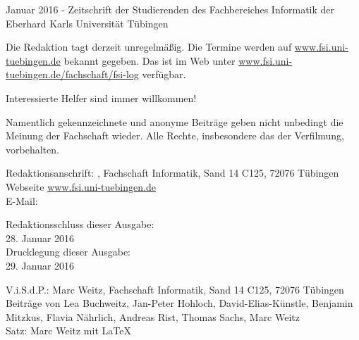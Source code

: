 \nameit \space \space Januar 2016 - Zeitschrift der Studierenden des Fachbereiches Informatik der Eberhard Karls Universität Tübingen

Die Redaktion tagt derzeit unregelmäßig. Die Termine werden auf \url{www.fsi.uni-tuebingen.de} bekannt  gegeben.  Das  \nameit \space ist  im  Web  unter \url{www.fsi.uni-tuebingen.de/fachschaft/fsi-log} verfügbar.

Interessierte Helfer sind immer willkommen!

Namentlich gekennzeichnete und anonyme Beiträge geben nicht unbedingt die Meinung der Fachschaft wieder. Alle Rechte, insbesondere das der Verfilmung, vorbehalten.

Redaktionsanschrift:
\nameit, Fachschaft Informatik, Sand 14 C125, 72076 Tübingen\\
Webseite \url{www.fsi.uni-tuebingen.de}\\
E-Mail:

Redaktionsschluss dieser Ausgabe:\\
28. Januar 2016\\
Drucklegung dieser Ausgabe:\\
29. Januar 2016

V.i.S.d.P.: Marc Weitz, Fachschaft Informatik, Sand 14 C125, 72076 Tübingen\\
Beiträge von Lea Buchweitz, Jan-Peter Hohloch, David-Elias-Künstle, Benjamin Mitzkus, Flavia Nährlich, Andreas Rist, Thomas Sachs, Marc Weitz\\
Satz: Marc Weitz mit \LaTeX 


